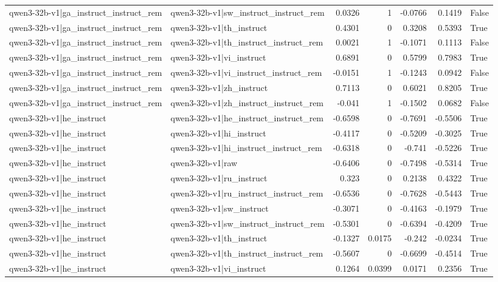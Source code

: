 \begin{table}
\begin{tabular}{l l r r r r l}
qwen3-32b-v1|ga_instruct_instruct_rem & qwen3-32b-v1|sw_instruct_instruct_rem & 0.0326 & 1 & -0.0766 & 0.1419 & False \\
qwen3-32b-v1|ga_instruct_instruct_rem & qwen3-32b-v1|th_instruct & 0.4301 & 0 & 0.3208 & 0.5393 & True \\
qwen3-32b-v1|ga_instruct_instruct_rem & qwen3-32b-v1|th_instruct_instruct_rem & 0.0021 & 1 & -0.1071 & 0.1113 & False \\
qwen3-32b-v1|ga_instruct_instruct_rem & qwen3-32b-v1|vi_instruct & 0.6891 & 0 & 0.5799 & 0.7983 & True \\
qwen3-32b-v1|ga_instruct_instruct_rem & qwen3-32b-v1|vi_instruct_instruct_rem & -0.0151 & 1 & -0.1243 & 0.0942 & False \\
qwen3-32b-v1|ga_instruct_instruct_rem & qwen3-32b-v1|zh_instruct & 0.7113 & 0 & 0.6021 & 0.8205 & True \\
qwen3-32b-v1|ga_instruct_instruct_rem & qwen3-32b-v1|zh_instruct_instruct_rem & -0.041 & 1 & -0.1502 & 0.0682 & False \\
qwen3-32b-v1|he_instruct & qwen3-32b-v1|he_instruct_instruct_rem & -0.6598 & 0 & -0.7691 & -0.5506 & True \\
qwen3-32b-v1|he_instruct & qwen3-32b-v1|hi_instruct & -0.4117 & 0 & -0.5209 & -0.3025 & True \\
qwen3-32b-v1|he_instruct & qwen3-32b-v1|hi_instruct_instruct_rem & -0.6318 & 0 & -0.741 & -0.5226 & True \\
qwen3-32b-v1|he_instruct & qwen3-32b-v1|raw & -0.6406 & 0 & -0.7498 & -0.5314 & True \\
qwen3-32b-v1|he_instruct & qwen3-32b-v1|ru_instruct & 0.323 & 0 & 0.2138 & 0.4322 & True \\
qwen3-32b-v1|he_instruct & qwen3-32b-v1|ru_instruct_instruct_rem & -0.6536 & 0 & -0.7628 & -0.5443 & True \\
qwen3-32b-v1|he_instruct & qwen3-32b-v1|sw_instruct & -0.3071 & 0 & -0.4163 & -0.1979 & True \\
qwen3-32b-v1|he_instruct & qwen3-32b-v1|sw_instruct_instruct_rem & -0.5301 & 0 & -0.6394 & -0.4209 & True \\
qwen3-32b-v1|he_instruct & qwen3-32b-v1|th_instruct & -0.1327 & 0.0175 & -0.242 & -0.0234 & True \\
qwen3-32b-v1|he_instruct & qwen3-32b-v1|th_instruct_instruct_rem & -0.5607 & 0 & -0.6699 & -0.4514 & True \\
qwen3-32b-v1|he_instruct & qwen3-32b-v1|vi_instruct & 0.1264 & 0.0399 & 0.0171 & 0.2356 & True \\

\end{tabular}
\end{table}
